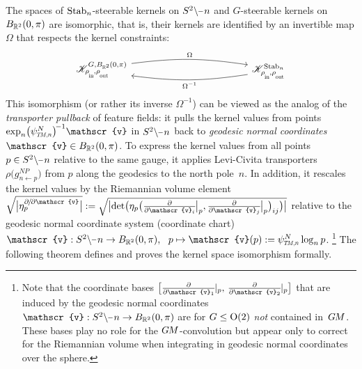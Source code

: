 The spaces of $\operatorname{Stab}_{n}$-steerable kernels on $S^2\backslash \mkern-1mu\minus\mkern1mu n$ and $G$-steerable kernels on $B_{\mathbb{R}^2}(0,\pi)$ are isomorphic, that is, their kernels are identified by an invertible map $\Omega$ that respects the kernel constraints:
\begin{equation}
    \begin{tikzcd}[row sep=3.5em, column sep=12.em]
        \mathscr{K}^{G,B_{\R^2}\mkern-1mu(0,\pi)}_{\rhoin\mkern-1mu,\rhoout}
            \arrow[r, bend left=8, shift left=2pt, "\Omega"]
        &
        \mathscr{K}^{\Stab{n}}_{\rhoin\mkern-1mu,\rhoout}
            \arrow[l, bend left=8, shift left=2pt, "\Omega^{-1}"]
    \end{tikzcd}
\end{equation}
This isomorphism (or rather its inverse $\Omega^{-1}$) can be viewed as the analog of the \emph{transporter pullback} of feature fields:
it pulls the kernel values from points $\exp_n\! \big(\psiTMn^N\big)^{\!-1} \mathscr{v}$ in $S^2\backslash \mkern-1mu\minus\mkern1mu n$ back to \emph{geodesic normal coordinates} $\mathscr{v}\in B_{\R^2}(0,\pi)$.
To express the kernel values from all points $p\in S^2\backslash \mkern-1mu\minus\mkern1mu n$ relative to the same gauge, it applies Levi-Civita transporters $\rho\big( g_{n\leftarrow p}^{NP} \big)$ from $p$ along the geodesics to the north pole~$n$.
In addition, it rescales the kernel values by the Riemannian volume element
$\sqrt{\big|\eta_p^{\partial\mkern-2mu/\mkern-2mu\partial\mathscr{v}}\big|}
:= {\sqrt{\big| \!\det\!\big( \eta_p\big( \frac{\partial}{\partial \mathscr{v}_i} \mkern-2mu\big|_p, \frac{\partial}{\partial \mathscr{v}_j} \mkern-2mu\big|_p \big)_{ij} \big)\big|} }$
relative to the geodesic normal coordinate system (coordinate chart)
$\mathscr{v}: S^2\backslash \mkern-1mu\minus\mkern1mu n \to B_{\R^2}(0,\pi),\ \ p \mapsto \mathscr{v}(p) := \psiTMn^N \log_n p$.%
\footnote{
    Note that the coordinate bases
    $\big[ \frac{\partial}{\partial\mathscr{v}_1} \mkern-2mu|_p,\, \frac{\partial}{\partial\mathscr{v}_2} \mkern-2mu|_p \big]$
    that are induced by the geodesic normal coordinates
    $\mathscr{v}: S^2\backslash \mkern-1mu\minus\mkern1mu n \to B_{\R^2}(0,\pi)$
    are for $G\leq\operatorname{O}(2)$ \emph{not} contained in~$G\mkern-1.4muM$.
    These bases play no role for the $G\mkern-1.4muM$-convolution but appear only to correct for the Riemannian volume when integrating in geodesic normal coordinates over the sphere.
}
The following theorem defines and proves the kernel space isomorphism formally.
